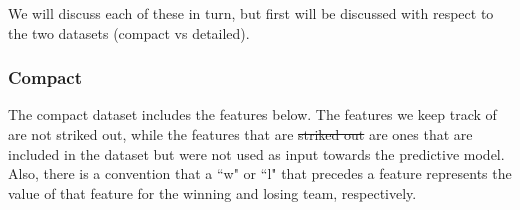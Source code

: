 \documentclass{article} %
\begin{document}
We will discuss each of these in turn, but first \label{itm:features-pertinent} will be discussed with respect to the two datasets (compact vs detailed).


\subsubsection{Compact}
\label{sec:data-features-compact}

The compact dataset includes the features below.
The features we keep track of are not striked out, while the features that are \sout{striked out} are ones that are included in the dataset but were not used as input towards the predictive model.
Also, there is a convention that a ``w" or ``l" that precedes a feature represents the value of that feature for the winning and losing team, respectively.
\end{document}
